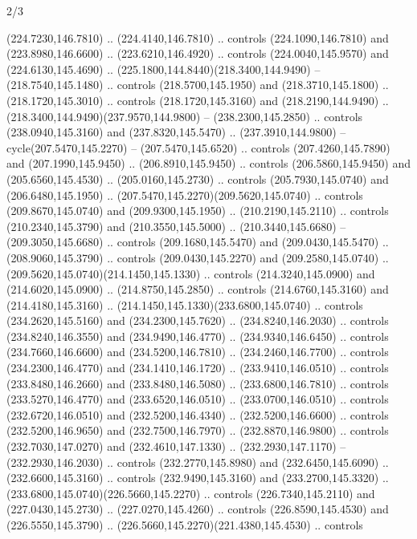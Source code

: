 \begin{flagdescription}{2/3}
\begin{scope}[xshift=0.5\flaglength,yshift=0.5\flagwidth,scale=\flagwidth/259.2]
\begin{scope}[y=0.8pt, x=0.8pt, yscale=-1,shift={(-243,-162)}]
      (224.7230,146.7810) .. (224.4140,146.7810) .. controls (224.1090,146.7810) and
      (223.8980,146.6600) .. (223.6210,146.4920) .. controls (224.0040,145.9570) and
      (224.6130,145.4690) .. (225.1800,144.8440)(218.3400,144.9490) --
      (218.7540,145.1480) .. controls (218.5700,145.1950) and (218.3710,145.1800) ..
      (218.1720,145.3010) .. controls (218.1720,145.3160) and (218.2190,144.9490) ..
      (218.3400,144.9490)(237.9570,144.9800) -- (238.2300,145.2850) .. controls
      (238.0940,145.3160) and (237.8320,145.5470) .. (237.3910,144.9800) --
      cycle(207.5470,145.2270) -- (207.5470,145.6520) .. controls
      (207.4260,145.7890) and (207.1990,145.9450) .. (206.8910,145.9450) .. controls
      (206.5860,145.9450) and (205.6560,145.4530) .. (205.0160,145.2730) .. controls
      (205.7930,145.0740) and (206.6480,145.1950) ..
      (207.5470,145.2270)(209.5620,145.0740) .. controls (209.8670,145.0740) and
      (209.9300,145.1950) .. (210.2190,145.2110) .. controls (210.2340,145.3790) and
      (210.3550,145.5000) .. (210.3440,145.6680) -- (209.3050,145.6680) .. controls
      (209.1680,145.5470) and (209.0430,145.5470) .. (208.9060,145.3790) .. controls
      (209.0430,145.2270) and (209.2580,145.0740) ..
      (209.5620,145.0740)(214.1450,145.1330) .. controls (214.3240,145.0900) and
      (214.6020,145.0900) .. (214.8750,145.2850) .. controls (214.6760,145.3160) and
      (214.4180,145.3160) .. (214.1450,145.1330)(233.6800,145.0740) .. controls
      (234.2620,145.5160) and (234.2300,145.7620) .. (234.8240,146.2030) .. controls
      (234.8240,146.3550) and (234.9490,146.4770) .. (234.9340,146.6450) .. controls
      (234.7660,146.6600) and (234.5200,146.7810) .. (234.2460,146.7700) .. controls
      (234.2300,146.4770) and (234.1410,146.1720) .. (233.9410,146.0510) .. controls
      (233.8480,146.2660) and (233.8480,146.5080) .. (233.6800,146.7810) .. controls
      (233.5270,146.4770) and (233.6520,146.0510) .. (233.0700,146.0510) .. controls
      (232.6720,146.0510) and (232.5200,146.4340) .. (232.5200,146.6600) .. controls
      (232.5200,146.9650) and (232.7500,146.7970) .. (232.8870,146.9800) .. controls
      (232.7030,147.0270) and (232.4610,147.1330) .. (232.2930,147.1170) --
      (232.2930,146.2030) .. controls (232.2770,145.8980) and (232.6450,145.6090) ..
      (232.6600,145.3160) .. controls (232.9490,145.3160) and (233.2700,145.3320) ..
      (233.6800,145.0740)(226.5660,145.2270) .. controls (226.7340,145.2110) and
      (227.0430,145.2730) .. (227.0270,145.4260) .. controls (226.8590,145.4530) and
      (226.5550,145.3790) .. (226.5660,145.2270)(221.4380,145.4530) .. controls

\end{scope}
\end{scope}
\end{flagdescription}
